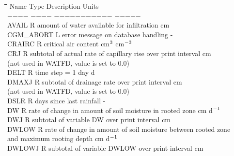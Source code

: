 \begin{tabbing}
\hspace{1.27cm}\=\hspace{1.27cm}\=\hspace{1.27cm}\=\hspace{1.27cm}\=%
\hspace{1.27cm}\=\hspace{1.27cm}\=\hspace{1.27cm}\=\hspace{1.27cm}\=%
\hspace{1.27cm}\=\hspace{1.27cm}\=\kill
Name    \> \> Type   \> Description                                        \> \> \> \> \> \> \> Units\\
$-$$-$$-$$-$    \> \> $-$$-$$-$$-$   \> $-$$-$$-$$-$$-$$-$$-$$-$$-$$-$$-$                                        \> \> \> \> \> \> \> $-$$-$$-$$-$$-$\\
AVAIL\> \> R\> amount of water available for infiltration\> \> \> \> \> \> \> cm\\
CGM\_ABORT\> \> L\> error message on database handling\> \> \> \> \> \> \> -\\
CRAIRC\> \> R\> critical air content\> \> \> \> \> \> \> cm$^{{\rm 3}}$ cm$^{{\rm -3}}$\\
CRJ\> \> R\> subtotal of actual rate of capillary rise over print interval\> \> \> \> \> \> \> cm\\
\>\> \> (not used in WATFD, value is set to 0.0)\\
DELT\> \> R\> time step = 1 day\> \> \> \> \> \> \> d\\
DMAXJ\> \> R\> subtotal of drainage rate over print interval\> \> \> \> \> \> \> cm\\
\>\> \> (not used in WATFD, value is set to 0.0)\\
DSLR\> \> R\> days since last rainfall\> \> \> \> \> \> \> -\\
DW\> \> R\> rate of change in amount of soil moisture in rooted zone\> \> \> \> \> \> \> cm d$^{{\rm -1}}$\\
DWJ\> \> R\> subtotal of variable DW over print interval\> \> \> \> \> \> \> cm  \\
DWLOW\> \> R\> rate of change in amount of soil moisture between rooted zone \\
\>\> \> and maximum rooting depth\> \> \> \> \> \> \> cm d$^{{\rm -1}}$\\
DWLOWJ\> \> R\> subtotal of variable DWLOW over print interval\> \> \> \> \> \> \> cm \\

\end{tabbing}
